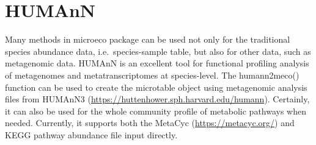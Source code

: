 \documentclass[
]{book}
\begin{document}
\hypertarget{humann}{%
\section{HUMAnN}\label{humann}}

Many methods in microeco package can be used not only for the traditional species abundance data, i.e.~species-sample table,
but also for other data, such as metagenomic data.
HUMAnN \citep{Franzosa_Species_2018} is an excellent tool for functional profiling analysis of metagenomes and metatranscriptomes at species-level.
The humann2meco() function can be used to create the microtable object using metagenomic analysis files from HUMAnN3 (\url{https://huttenhower.sph.harvard.edu/humann}).
Certainly, it can also be used for the whole community profile of metabolic pathways when needed.
Currently, it supports both the MetaCyc (\url{https://metacyc.org/}) and KEGG pathway abundance file input directly.
\end{document}
